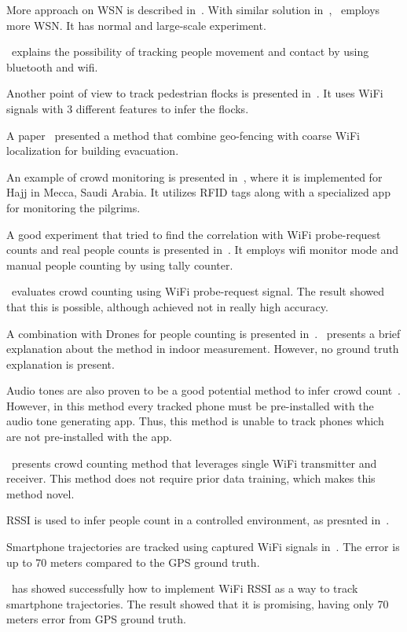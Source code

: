\documentclass{article}
\begin{document}
More approach on WSN is described in~\cite{thesis043}. With similar solution in~\cite{thesis042},~\cite{thesis043} employs more WSN. It has normal and large-scale experiment.

\cite{thesis022}~explains the possibility of tracking people movement and contact by using bluetooth and wifi.

Another point of view to track pedestrian flocks is presented in~\cite{thesis033}. It uses WiFi signals with 3 different features to infer the flocks.

A paper~\cite{thesis045} presented a method that combine geo-fencing with coarse WiFi localization for building evacuation.

An example of crowd monitoring is presented in~\cite{thesis050}, where it is implemented for Hajj in Mecca, Saudi Arabia. It utilizes RFID tags along with a specialized app for monitoring the pilgrims.

A good experiment that tried to find the correlation with WiFi probe-request counts and real people counts is presented in~\cite{thesis047}. It employs wifi monitor mode and manual people counting by using tally counter.

\cite{thesis057}~evaluates crowd counting using WiFi probe-request signal. The result showed that this is possible, although achieved not in really high accuracy.

A combination with Drones for people counting is presented in~\cite{thesis053}. \cite{thesis060}~presents a brief explanation about the method in indoor measurement. However, no ground truth explanation is present.

Audio tones are also proven to be a good potential method to infer crowd count~\cite{thesis044}. However, in this method every tracked phone must be pre-installed with the audio tone generating app. Thus, this method is unable to track phones which are not pre-installed with the app.

\cite{thesis051}~presents crowd counting method that leverages single WiFi transmitter and receiver. This method does not require prior data training, which makes this method novel.

RSSI is used to infer people count in a controlled environment, as presnted in~\cite{thesis052}. 

Smartphone trajectories are tracked using captured WiFi signals in~\cite{thesis058}. The error is up to 70 meters compared to the GPS ground truth.

\cite{thesis048}~has showed successfully how to implement WiFi RSSI as a way to track smartphone trajectories. The result showed that it is promising, having only 70 meters error from GPS ground truth.
\end{document}
